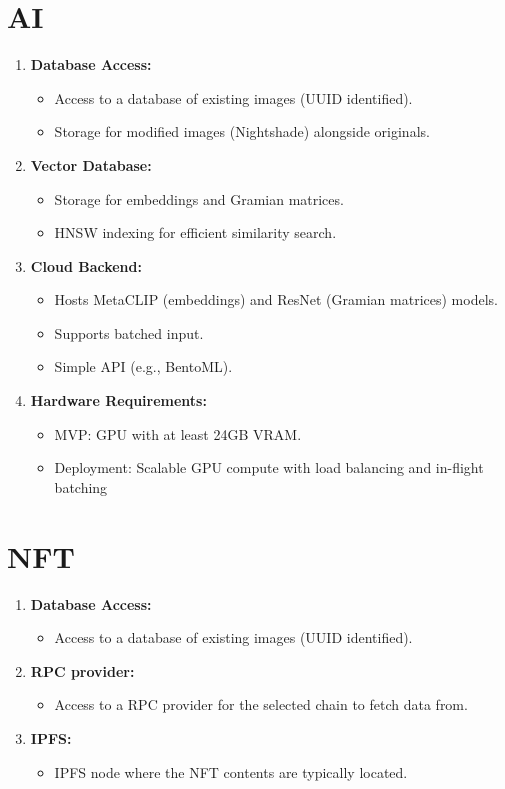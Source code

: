 \section{AI}
\begin{enumerate}
\item \textbf{Database Access:}
    \begin{itemize}
    \item Access to a database of existing images (UUID identified).
    \item Storage for modified images (Nightshade) alongside originals.
    \end{itemize}
\item \textbf{Vector Database:}
    \begin{itemize}
    \item Storage for embeddings and Gramian matrices.
    \item HNSW indexing for efficient similarity search.
    \end{itemize}

\item \textbf{Cloud Backend:}
    \begin{itemize}
    \item Hosts MetaCLIP (embeddings) and ResNet (Gramian matrices) models.
    \item Supports batched input.
    \item Simple API (e.g., BentoML).
    \end{itemize}

\item \textbf{Hardware Requirements:}
    \begin{itemize}
    \item MVP: GPU with at least 24GB VRAM.
    \item Deployment: Scalable GPU compute with load balancing and in-flight batching
    \end{itemize}
\end{enumerate}

\section{NFT}
\begin{enumerate}
    \item \textbf{Database Access:}
    \begin{itemize}
    \item Access to a database of existing images (UUID identified).
    \end{itemize}

\item \textbf{RPC provider:}
    \begin{itemize}
    \item Access to a RPC provider for the selected chain to fetch data from.
    \end{itemize}

\item \textbf{IPFS:}
    \begin{itemize}
    \item IPFS node where the NFT contents are typically located.
    \end{itemize}
\end{enumerate}

